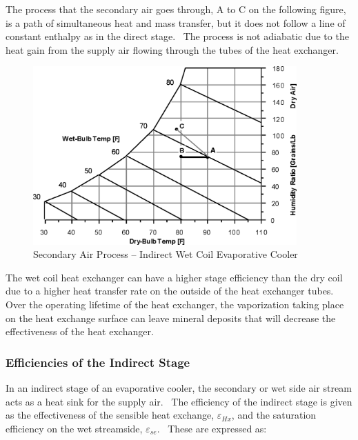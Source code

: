 The process that the secondary air goes through, A to C on the following figure, is a path of simultaneous heat and mass transfer, but it does not follow a line of constant enthalpy as in the direct stage.~ The process is not adiabatic due to the heat gain from the supply air flowing through the tubes of the heat exchanger.

\begin{figure}[hbtp] %
\centering
\includegraphics[width=0.9\textwidth, height=0.9\textheight, keepaspectratio=true]{media/image4798.png}
\caption{Secondary Air Process – Indirect Wet Coil Evaporative Cooler \protect \label{fig:secondary-air-process-indirect-wet-coil}}
\end{figure}

The wet coil heat exchanger can have a higher stage efficiency than the dry coil due to a higher heat transfer rate on the outside of the heat exchanger tubes.~ Over the operating lifetime of the heat exchanger, the vaporization taking place on the heat exchange surface can leave mineral deposits that will decrease the effectiveness of the heat exchanger.

\subsubsection{Efficiencies of the Indirect Stage}\label{efficiencies-of-the-indirect-stage}

In an indirect stage of an evaporative cooler, the secondary or wet side air stream acts as a heat sink for the supply air.~ The efficiency of the indirect stage is given as the effectiveness of the sensible heat exchange, \({\varepsilon_{Hx}}\), and the saturation efficiency on the wet streamside, \({\varepsilon_{se}}\).~ These are expressed as:

